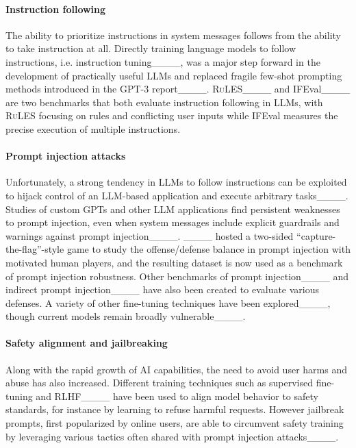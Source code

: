 \paragraph{Instruction following}
The ability to prioritize instructions in system messages follows from the ability to take instruction at all.
Directly training language models to follow instructions, i.e. instruction tuning____, was a major step forward in the development of practically useful LLMs and replaced fragile few-shot prompting methods introduced in the GPT-3 report____.
\textsc{RuLES}____ and IFEval____ are two benchmarks that both evaluate instruction following in LLMs, with \textsc{RuLES} focusing on rules and conflicting user inputs while IFEval measures the precise execution of multiple instructions.

\paragraph{Prompt injection attacks}
Unfortunately, a strong tendency in LLMs to follow instructions can be exploited to hijack control of an LLM-based application and execute arbitrary tasks____.
Studies of custom GPTs and other LLM applications find persistent weaknesses to prompt injection, even when system messages include explicit guardrails and warnings against prompt injection____.
____ hosted a two-sided ``capture-the-flag''-style game to study the offense/defense balance in prompt injection with motivated human players, and the resulting dataset is now used as a benchmark of prompt injection robustness.
Other benchmarks of prompt injection____ and indirect prompt injection____ have also been created to evaluate various defenses.
A variety of other fine-tuning techniques have been explored____, though current models remain broadly vulnerable____.

\paragraph{Safety alignment and jailbreaking}
Along with the rapid growth of AI capabilities, the need to avoid user harms and abuse has also increased.
Different training techniques such as supervised fine-tuning and RLHF____ have been used to align model behavior to safety standards, for instance by learning to refuse harmful requests.
However jailbreak prompts, first popularized by online users, are able to circumvent safety training by leveraging various tactics often shared with prompt injection attacks____.